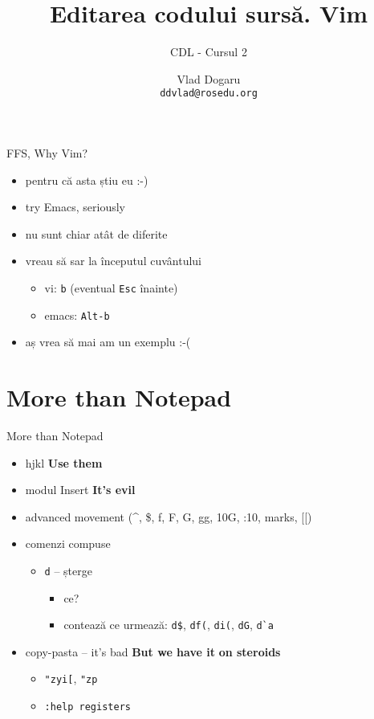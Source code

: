 \documentclass{beamer}
\title[]{Editarea codului surs\u{a}. Vim}
\subtitle{CDL - Cursul 2}
\institute[]{ROSEdu}
\author[]{Vlad Dogaru \\ \texttt{ddvlad@rosedu.org}}
\begin{document}
\maketitle

\tableofcontents

\begin{frame}{FFS, Why Vim?}
  \begin{itemize}
    \item pentru că asta știu eu :-)
    \pause
    \item try Emacs, seriously
    \pause
    \item nu sunt chiar atât de diferite
    \pause
    \item vreau să sar la începutul cuvântului
    \begin{itemize}
      \item vi: \texttt{b} (eventual \texttt{Esc} înainte)
      \item emacs: \texttt{Alt-b}
    \end{itemize}
    \pause
    \item aș vrea să mai am un exemplu :-(
  \end{itemize}
\end{frame}

\section{More than Notepad}
\begin{frame}{More than Notepad}
  \begin{itemize}
    \item hjkl \pause \hspace{1cm} \textbf{Use them}
    \pause
    \item modul Insert \pause \hspace{1cm} \textbf{It's evil}
    \pause
    \item advanced movement (\^{}, \$, f, F, G, gg, 10G, :10, marks, [[)
    \pause
    \item comenzi compuse
    \pause
    \begin{itemize}
      \item \texttt{d} -- șterge
      \begin{itemize}
        \item ce?
        \pause
        \item contează ce urmează: \texttt{d\$}, \texttt{df(}, \texttt{di(},
          \texttt{dG}, \texttt{d\`{}a}
      \end{itemize}
    \end{itemize}
    \pause
    \item copy-pasta -- it's bad \pause \hspace{1cm} \textbf{But we have it}
    \pause \textbf{on steroids}
    \begin{itemize}
      \pause
      \item \texttt{"zyi[}, \texttt{"zp}
      \item \texttt{:help registers}
    \end{itemize}
  \end{itemize}
\end{frame}
\end{document}
